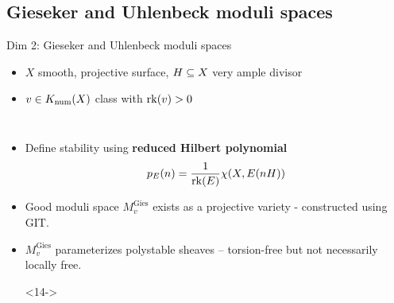 \documentclass[8pt,handout]{beamer} %
\begin{document}
\subsection{Gieseker and Uhlenbeck moduli spaces}
\begin{frame}[fragile]{Dim 2: Gieseker and Uhlenbeck moduli spaces}
    \begin{itemize}
        \item<2->[] $X$ smooth, projective surface, $H \subseteq X$ very ample divisor
        \item<3->[] $v \in K_{\mathrm{num}}(X)$ class with $\operatorname{\mathrm{rk}}(v) > 0$
        \item[]
    \end{itemize}
    
    \begin{columns}[t]
        \begin{itemize}
            \item<5-> Define stability using \textbf{reduced Hilbert polynomial}
            \[ p_E(n) = \frac{1}{\operatorname{\mathrm{rk}}(E)} \chi(X, E(n H)) \]
            \item<6-> Good moduli space $M^{\text{Gies}}_v$ exists as a projective variety - constructed using GIT.
            \item<7-> $M^{\text{Gies}}_v$ parameterizes polystable sheaves -- torsion-free but not necessarily locally free.
            \item[]
            \item[]<14->
            \begin{center}
            \end{center}
        \end{itemize}
        

\end{columns}
\end{frame}
\end{document}
